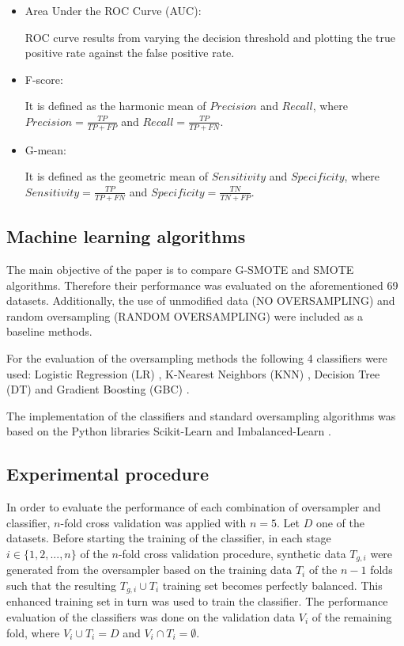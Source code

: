 \documentclass[parskip=full]{scrartcl}
\begin{document}
\begin{itemize}
	
	\renewcommand\labelitemi{--}
	
	\item Area Under the ROC Curve (AUC):
	
	ROC curve results from varying the decision threshold and plotting the true
	positive rate against the false positive rate.
	
	\item F-score:
	
	It is defined as the harmonic mean of \(Precision\) and \(Recall\), where
	\(Precision = \frac{TP}{TP + FP}\) and \(Recall = \frac{TP}{TP + FN}\).
	
	\item G-mean:
	
	It is defined as the geometric mean of \(Sensitivity\) and \(Specificity\),
	where \(Sensitivity = \frac{TP}{TP + FN}\) and \(Specificity = \frac{TN}{TN
	+ FP}\).
	
\end{itemize}

\subsection{Machine learning algorithms}

The main objective of the paper is to compare G-SMOTE and SMOTE algorithms.
Therefore their performance was evaluated on the aforementioned 69 datasets.
Additionally, the use of unmodified data (NO OVERSAMPLING) and random
oversampling (RANDOM OVERSAMPLING) were included as a baseline methods.

For the evaluation of the oversampling methods the following 4 classifiers were
used: Logistic Regression (LR) \cite{McCullagh1989}, K-Nearest Neighbors (KNN)
\cite{Cover1967}, Decision Tree (DT) \cite{Salzberg1994} and Gradient Boosting
(GBC) \cite{Friedman2001}.

The implementation of the classifiers and standard oversampling algorithms was
based on the Python libraries Scikit-Learn \cite{Pedregosa2011} and
Imbalanced-Learn \cite{Lemaitre2016}.

\subsection{Experimental procedure}

In order to evaluate the performance of each combination of oversampler and
classifier, \( n \)-fold cross validation was applied with \( n = 5 \). Let
\(D\) one of the datasets. Before starting the training of the classifier, in
each stage \(i \in \{1, 2 ,... , n \} \) of the \( n \)-fold cross validation
procedure, synthetic data \( T_{g, i} \) were generated from the oversampler
based on the training data \(T_{i} \) of the \( n - 1 \) folds such that the
resulting \(T_{g, i} \cup T_{i} \) training set becomes perfectly balanced. This
enhanced training set in turn was used to train the classifier. The performance
evaluation of the classifiers was done on the validation data \( V_{i} \) of the
remaining fold, where \(V_{i} \cup T_{i} = D \) and \(V_{i} \cap T_{i} =
\emptyset \).
\end{document}

